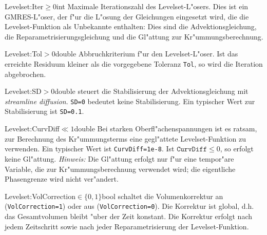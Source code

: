\begin{Desc}
{Levelset:Iter}{$\geq0$}{int}
Maximale Iterationszahl des Levelset-L"osers. Dies ist ein GMRES-L"oser, der 
f"ur die L"osung der Gleichungen eingesetzt wird, die die Levelset-Funktion 
als Unbekannte enthalten:
Dies sind die Advektionsgleichung, die Reparametrisierungsgleichung und die
Gl"attung zur Kr"ummungsberechnung. 
\end{Desc}
%
\begin{Desc}
{Levelset:Tol}{$>0$}{double}
Abbruchkriterium f"ur den Levelset-L"oser. Ist das erreichte Residuum kleiner 
als die vorgegebene Toleranz \verb|Tol|, so wird die Iteration abgebrochen.
\end{Desc}
%
\begin{Desc}
{Levelset:SD}{$>0$}{double}
steuert die Stabilisierung der Advektionsgleichung mit \emph{streamline 
diffusion}. \verb|SD=0| bedeutet keine Stabilisierung. Ein typischer Wert zur
Stabilisierung ist \verb|SD=0.1|.
\end{Desc}
%
\begin{Desc}
{Levelset:CurvDiff}{$\ll1$}{double}
Bei starken Oberfl"achenspannungen ist es ratsam, zur Berechnung des
Kr"ummungsterms eine gegl"attete Levelset-Funktion zu verwenden. Ein typischer
Wert ist \verb|CurvDiff=1e-8|. Ist $\mathtt{CurvDiff}\leq0$, so erfolgt keine 
Gl"attung. \emph{Hinweis:} Die Gl"attung erfolgt nur f"ur eine tempor"are
Variable, die zur Kr"ummungsberechnung verwendet wird; die eigentliche 
Phasengrenze wird nicht ver"andert.
\end{Desc}
%
\begin{Desc}
{Levelset:VolCorrection}{$\in\{0,1\}$}{bool}
schaltet die Volumenkorrektur an (\verb|VolCorrection=1|) oder aus 
(\verb|VolCorrection=0|). Die Korrektur ist global, d.h. das Gesamtvolumen
bleibt "uber der Zeit konstant. Die Korrektur erfolgt nach jedem Zeitschritt
sowie nach jeder Reparametrisierung der Levelset-Funktion.
\end{Desc}


